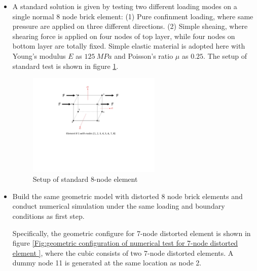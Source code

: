 \documentclass{article}
\begin{document}
\begin{itemize}
\item 
A standard solution is given by testing two different loading modes on a single normal 8 node brick element:
%
(1) Pure confinment loading, where same pressure are applied on three different directions. 
%
(2) Simple sheaing, where shearing force is applied on four nodes of top layer, while four nodes on bottom layer are totally fixed. 
%
Simple elastic material is adopted here with Young's modulus $E$ as $125\ MPa$ and Poisson's ratio $\mu$ as $0.25$. 
%
The setup of standard test is shown in figure \ref{Fig:setup of standard 8-node element}. 
%
\begin{figure}[H]
\begin{center}
\includegraphics[width=0.6\textwidth]{images/standard_8_node_element.pdf}
\end{center}
\caption{\label{Fig:setup of standard 8-node element} Setup of standard 8-node element}
\end{figure}




%
\item Build the same geometric model with distorted 8 node brick elements and conduct numerical simulation under the same loading and boundary conditions as first step. 

Specifically, the geometric configure for 7-node distorted element is shown in figure \ref{Fig:geometric configuration of numerical test for 7-node distorted element }, where the cubic consists of two 7-node distorted elements. A dummy node 11 is generated at the same location as node 2. 


\end{itemize}
\end{document}
